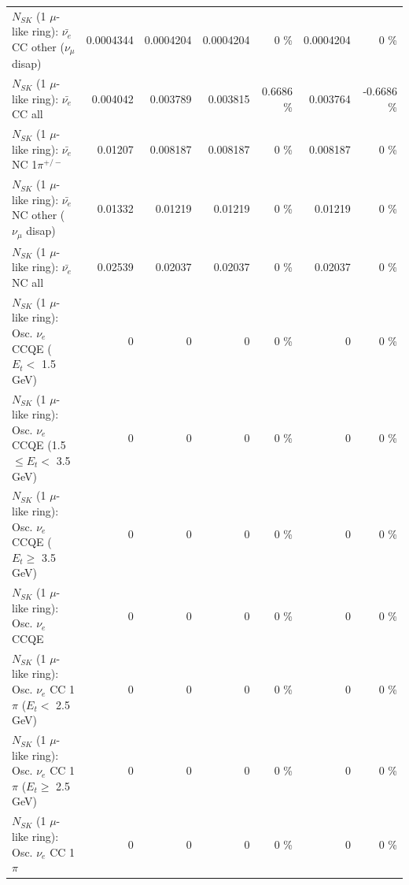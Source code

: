 \begin{table}
\begin{tabular}{| l | r | r | r  r | r  r |}
          $N_{SK}$ (1 $\mu$-like ring): $\bar{\nu_e}$ CC other ($\nu_\mu$ disap) &       0.0004344 &       0.0004204 &       0.0004204 &        0 \%  &       0.0004204 &        0 \%  \\ 
                            $N_{SK}$ (1 $\mu$-like ring): $\bar{\nu_{e}}$ CC all &        0.004042 &        0.003789 &        0.003815 &   0.6686 \%  &        0.003764 &  -0.6686 \%  \\ 
\hline
                     $N_{SK}$ (1 $\mu$-like ring): $\bar{\nu_e}$ NC 1$\pi^{+/-}$ &         0.01207 &        0.008187 &        0.008187 &        0 \%  &        0.008187 &        0 \%  \\ 
          $N_{SK}$ (1 $\mu$-like ring): $\bar{\nu_e}$ NC other ($\nu_\mu$ disap) &         0.01332 &         0.01219 &         0.01219 &        0 \%  &         0.01219 &        0 \%  \\ 
                            $N_{SK}$ (1 $\mu$-like ring): $\bar{\nu_{e}}$ NC all &         0.02539 &         0.02037 &         0.02037 &        0 \%  &         0.02037 &        0 \%  \\ 
\hline
\hline
\hline
             $N_{SK}$ (1 $\mu$-like ring): Osc. $\nu_e$ CCQE ($E_{t} <$ 1.5 GeV) &               0 &               0 &               0 &        0 \%  &               0 &        0 \%  \\ 
    $N_{SK}$ (1 $\mu$-like ring): Osc. $\nu_e$ CCQE (1.5 $\leq E_{t} <$ 3.5 GeV) &               0 &               0 &               0 &        0 \%  &               0 &        0 \%  \\ 
          $N_{SK}$ (1 $\mu$-like ring): Osc. $\nu_e$ CCQE ($E_{t} \geq$ 3.5 GeV) &               0 &               0 &               0 &        0 \%  &               0 &        0 \%  \\ 
\hline
                                 $N_{SK}$ (1 $\mu$-like ring): Osc. $\nu_e$ CCQE &               0 &               0 &               0 &        0 \%  &               0 &        0 \%  \\ 
\hline
        $N_{SK}$ (1 $\mu$-like ring): Osc. $\nu_e$ CC 1$\pi$ ($E_{t} <$ 2.5 GeV) &               0 &               0 &               0 &        0 \%  &               0 &        0 \%  \\ 
     $N_{SK}$ (1 $\mu$-like ring): Osc. $\nu_e$ CC 1$\pi$ ($E_{t} \geq$ 2.5 GeV) &               0 &               0 &               0 &        0 \%  &               0 &        0 \%  \\ 
\hline
                            $N_{SK}$ (1 $\mu$-like ring): Osc. $\nu_e$ CC 1$\pi$ &               0 &               0 &               0 &        0 \%  &               0 &        0 \%  \\ 

\end{tabular}
\end{table}
